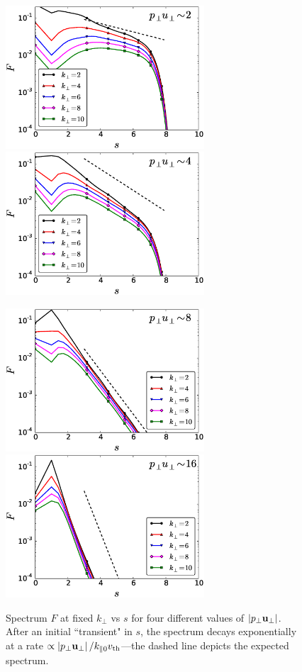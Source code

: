     \begin{figure}
    \begin{center}
        \includegraphics[width=7.4cm]{figs/phmixnlpp0/M100_2_fixkp_vss.eps}
        \includegraphics[width=7.4cm]{figs/phmixnlpp0/M100_4_fixkp_vss.eps}

        \includegraphics[width=7.4cm]{figs/phmixnlpp0/M100_8_fixkp_vss.eps}
        \includegraphics[width=7.4cm]{figs/phmixnlpp0/M100_16_fixkp_vss.eps}
        \caption{Spectrum $F$ at fixed $k_\perp$ vs $s$ for four different values of
        $\left|p_\perp \mathbf{u_\perp}\right|$.
        After an initial ``transient" in $s$, the spectrum decays exponentially at a
        rate $\propto \left|p_\perp \mathbf{u_\perp}\right|/k_{\parallel0} v_{\rm th}$---the dashed line depicts the
        expected spectrum.}
        \label{pp0:fig:fixkpvss}
    \end{center}
    \end{figure}
